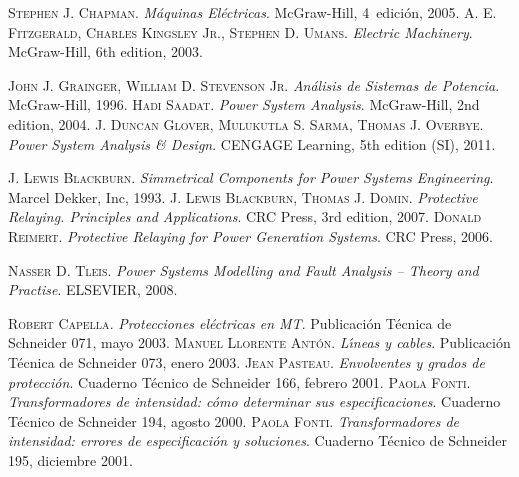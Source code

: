 \begin{thebibliography}{99}
     \textsc{Stephen J. Chapman}. \textsl{M\'{a}quinas El\'{e}ctricas}.  McGraw-Hill, 4\textordfeminine\ edici\'{o}n, 2005.
     \textsc{A. E. Fitzgerald, Charles Kingsley Jr., Stephen D. Umans}. \textsl{Electric Machinery}.  McGraw-Hill, 6th edition, 2003.


     \textsc{John J. Grainger, William D. Stevenson Jr}. \textsl{An\'{a}lisis de Sistemas de Potencia}.  McGraw-Hill, 1996.
     \textsc{Hadi Saadat}. \textsl{Power System Analysis}.  McGraw-Hill, 2nd edition, 2004.
     \textsc{J. Duncan Glover, Mulukutla S. Sarma, Thomas J. Overbye}. \textsl{Power System Analysis \& Design}.  CENGAGE Learning, 5th edition (SI), 2011.

     \textsc{J. Lewis Blackburn}. \textsl{Simmetrical Components for Power Systems Engineering}.  Marcel Dekker, Inc, 1993.
     \textsc{J. Lewis Blackburn, Thomas J. Domin}. \textsl{Protective Relaying. Principles and Applications}.  CRC Press, 3rd edition, 2007.
     \textsc{Donald Reimert}. \textsl{Protective Relaying for Power Generation Systems}.  CRC Press, 2006.


     \textsc{Nasser D. Tleis}. \textsl{Power Systems Modelling and Fault Analysis -- Theory and Practise}.  ELSEVIER, 2008.


     \textsc{Robert Capella}. \textsl{Protecciones el\'{e}ctricas en MT}.  Publicaci\'{o}n T\'{e}cnica de Schneider 071, mayo 2003.
     \textsc{Manuel Llorente Ant\'{o}n}. \textsl{L\'{\i}neas y cables}.  Publicaci\'{o}n T\'{e}cnica de Schneider 073, enero 2003.
     \textsc{Jean Pasteau}. \textsl{Envolventes y grados de protecci\'{o}n}.  Cuaderno T\'{e}cnico de Schneider 166, febrero 2001.
     \textsc{Paola Fonti}. \textsl{Transformadores de intensidad: c\'{o}mo determinar sus especificaciones}.  Cuaderno T\'{e}cnico de Schneider 194, agosto 2000.
     \textsc{Paola Fonti}. \textsl{Transformadores de intensidad: errores de especificaci\'{o}n y soluciones}.  Cuaderno T\'{e}cnico de Schneider 195, diciembre 2001.

\end{thebibliography}
